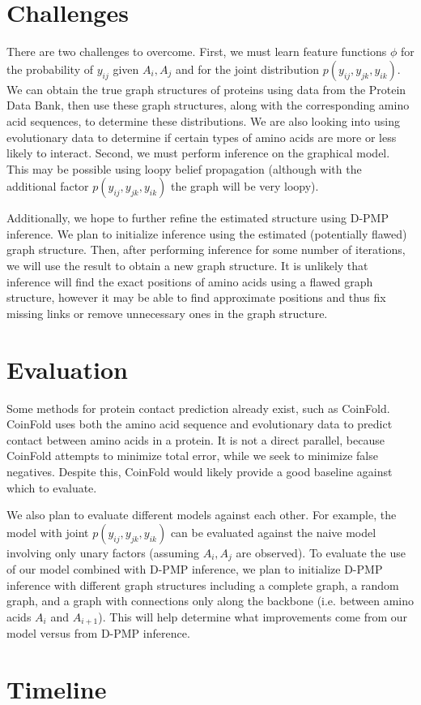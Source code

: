 \documentclass{article}
\begin{document}
\section{Challenges}
There are two challenges to overcome. First, we must learn feature functions $\phi$ for the probability of $y_{ij}$ given $A_i, A_j$ and for the joint distribution $p(y_{ij}, y_{jk}, y_{ik})$. We can obtain the true graph structures of proteins using data from the Protein Data Bank, then use these graph structures, along with the corresponding amino acid sequences, to determine these distributions. We are also looking into using evolutionary data to determine if certain types of amino acids are more or less likely to interact. Second, we must perform inference on the graphical model. This may be possible using loopy belief propagation (although with the additional factor $p(y_{ij}, y_{jk}, y_{ik})$ the graph will be very loopy).

Additionally, we hope to further refine the estimated structure using D-PMP inference. We plan to initialize inference using the estimated (potentially flawed) graph structure. Then, after performing inference for some number of iterations, we will use the result to obtain a new graph structure. It is unlikely that inference will find the exact positions of amino acids using a flawed graph structure, however it may be able to find approximate positions and thus fix missing links or remove unnecessary ones in the graph structure.

\section{Evaluation}
Some methods for protein contact prediction already exist, such as CoinFold. CoinFold uses both the amino acid sequence and evolutionary data to predict contact between amino acids in a protein. It is not a direct parallel, because CoinFold attempts to minimize total error, while we seek to minimize false negatives. Despite this, CoinFold would likely provide a good baseline against which to evaluate. 

We also plan to evaluate different models against each other. For example, the model with joint $p(y_{ij}, y_{jk}, y_{ik})$ can be evaluated against the naive model involving only unary factors (assuming $A_i, A_j$ are observed). To evaluate the use of our model combined with D-PMP inference, we plan to initialize D-PMP inference with different graph structures including a complete graph, a random graph, and a graph with connections only along the backbone (i.e. between amino acids $A_i$ and $A_{i+1}$). This will help determine what improvements come from our model versus from D-PMP inference.

\section{Timeline}

\end{document}
